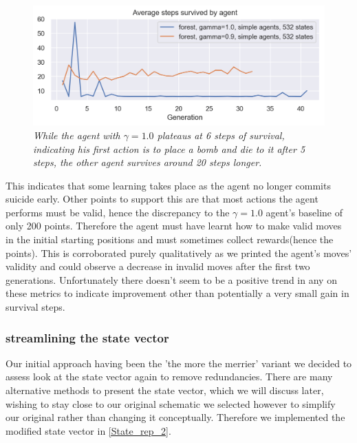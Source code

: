 \begin{figure}[!h]
\centering
	\includegraphics[width=\linewidth]{images/forest09_vs_forest1ste.png}
	\caption{\textit{While the agent with $\gamma = 1.0$ plateaus at 6 steps of survival, indicating his first action is to place a bomb and die to it after 5 steps, the other agent survives around 20 steps longer.}}
	\label{forest09_vs_forest1ste}
\end{figure}

This indicates that some learning takes place as the agent no longer commits suicide early. Other points to support this are that most actions the agent performs must be valid, hence the discrepancy to the $\gamma = 1.0$ agent's baseline of only 200 points. Therefore the agent must have learnt how to make valid moves in the initial starting positions and must sometimes collect rewards(hence the points). This is corroborated purely qualitatively as we printed the agent's moves' validity and could observe a decrease in invalid moves after the first two generations. Unfortunately there doesn't seem to be a positive trend in any on these metrics to indicate improvement other than potentially a very small gain in survival steps.

\subsubsection{streamlining the state vector}
Our initial approach having been the 'the more the merrier' variant we decided to assess look at the state vector again to remove redundancies. There are many alternative methods to present the state vector, which we will discuss later, wishing to stay close to our original schematic we selected however to simplify our original rather than changing it conceptually. Therefore we implemented the modified state vector in \ref{State_rep_2}.

